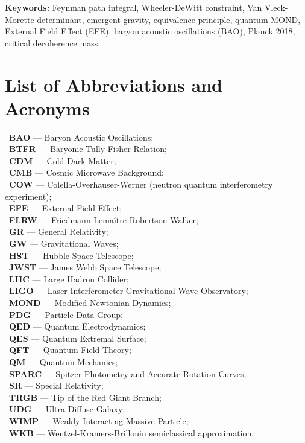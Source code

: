 \documentclass[11pt,a4paper]{article}
\theoremstyle{definition}
\begin{document}
\vspace{1em}
\noindent\textbf{Keywords:} Feynman path integral, Wheeler-DeWitt constraint, Van Vleck-Morette determinant, emergent gravity, equivalence principle, quantum MOND, External Field Effect (EFE), baryon acoustic oscillations (BAO), Planck 2018, critical decoherence mass.

\clearpage
\tableofcontents
\newpage

\section*{List of Abbreviations and Acronyms}

\noindent\textbullet~\textbf{BAO} --- Baryon Acoustic Oscillations;\\
\textbullet~\textbf{BTFR} --- Baryonic Tully-Fisher Relation;\\
\textbullet~\textbf{CDM} --- Cold Dark Matter;\\
\textbullet~\textbf{CMB} --- Cosmic Microwave Background;\\
\textbullet~\textbf{COW} --- Colella-Overhauser-Werner (neutron quantum interferometry experiment);\\
\textbullet~\textbf{EFE} --- External Field Effect;\\
\textbullet~\textbf{FLRW} --- Friedmann-Lema\^{i}tre-Robertson-Walker;\\
\textbullet~\textbf{GR} --- General Relativity;\\
\textbullet~\textbf{GW} --- Gravitational Waves;\\
\textbullet~\textbf{HST} --- Hubble Space Telescope;\\
\textbullet~\textbf{JWST} --- James Webb Space Telescope;\\
\textbullet~\textbf{LHC} --- Large Hadron Collider;\\
\textbullet~\textbf{LIGO} --- Laser Interferometer Gravitational-Wave Observatory;\\
\textbullet~\textbf{MOND} --- Modified Newtonian Dynamics;\\
\textbullet~\textbf{PDG} --- Particle Data Group;\\
\textbullet~\textbf{QED} --- Quantum Electrodynamics;\\
\textbullet~\textbf{QES} --- Quantum Extremal Surface;\\
\textbullet~\textbf{QFT} --- Quantum Field Theory;\\
\textbullet~\textbf{QM} --- Quantum Mechanics;\\
\textbullet~\textbf{SPARC} --- Spitzer Photometry and Accurate Rotation Curves;\\
\textbullet~\textbf{SR} --- Special Relativity;\\
\textbullet~\textbf{TRGB} --- Tip of the Red Giant Branch;\\
\textbullet~\textbf{UDG} --- Ultra-Diffuse Galaxy;\\
\textbullet~\textbf{WIMP} --- Weakly Interacting Massive Particle;\\
\textbullet~\textbf{WKB} --- Wentzel-Kramers-Brillouin semiclassical approximation.
\end{document}
